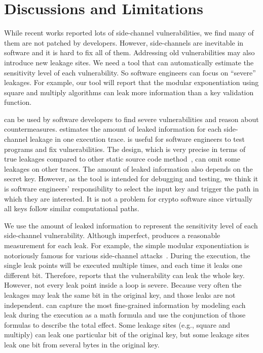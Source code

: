 \section{Discussions and Limitations}
While recent works reported lots of side-channel vulnerabilities, 
we find many of them are not patched by developers.
However, side-channels are inevitable in software and it is hard to fix all of them. 
Addressing old vulnerabilities may also introduce new leakage
sites. We need a
tool that can automatically estimate the sensitivity level of each vulnerability.
So software engineers can focus on
``severe'' leakages. For example, our tool will report that 
the modular exponentiation using square and multiply algorithms can
leak more information than a key validation function.

\tool{} can be used by software developers to find severe vulnerabilities
and reason about countermeasures.
\tool{} estimates the amount of leaked information for each side-channel leakage
in one execution trace. \tool{} is useful for software
engineers to test programs and fix vulnerabilities.
The design, which is very precise in terms of true leakages compared to other static source code
method~\cite{197207,BacelarAlmeida:2013:FVS:2483313.2483334}, can omit some
leakages on other traces. The amount of leaked information also depends on the secret key.
However, as the tool is intended for debugging and testing,
we think it is software engineers' responsibility to select the input key and trigger 
the path in which they are interested. It is not a problem for crypto software 
since virtually all keys follow similar computational paths.

We use the amount of leaked information to represent the sensitivity level of 
each side-channel vulnerability. Although imperfect, \tool{} produces a reasonable 
measurement for each leak. For example, the simple modular exponentiation is 
notoriously famous for various side-channel attacks~\cite{kocher1996timing}. 
During the execution, the single leak points will be executed multiple times, 
and each time it leaks one different bit. Therefore, \tool{} reports that the 
vulnerability can leak the whole key. However, not every leak point inside a 
loop is severe. Because very often the leakages may leak the same bit in the 
original key, and those leaks are not independent. \tool{} can capture the most 
fine-grained information by modeling each leak during the execution as a math 
formula and use the conjunction of those formulas to describe the total effect. 
Some leakage sites (e.g., square and multiply) 
can leak one particular bit of the original key, but some leakage sites leak one bit 
from several bytes in the original key. 

